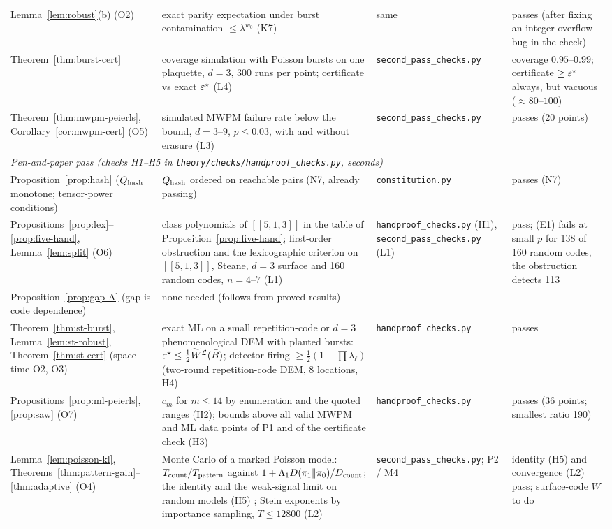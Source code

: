 {\begin{longtable}{p{3.7cm} p{4.5cm} p{3.2cm} p{2.6cm}}
Lemma~\ref{lem:robust}(b) (O2) & exact parity expectation under burst contamination $\le\lambda^{w_0}$ (K7) & same & passes (after fixing an integer-overflow bug in the check) \\
Theorem~\ref{thm:burst-cert} & coverage simulation with Poisson bursts on one plaquette, $d=3$, 300 runs per point; certificate vs exact $\varepsilon^{\star}$ (L4) & \texttt{second\_pass\_checks.py} & coverage $0.95$--$0.99$; certificate $\ge\varepsilon^{\star}$ always, but vacuous ($\approx80$--$100$) \\
Theorem~\ref{thm:mwpm-peierls}, Corollary~\ref{cor:mwpm-cert} (O5) & simulated MWPM failure rate below the bound, $d=3$--$9$, $p\le0.03$, with and without erasure (L3) & \texttt{second\_pass\_checks.py} & passes (20 points) \\
\multicolumn{4}{l}{\emph{Pen-and-paper pass (checks H1--H5 in \texttt{theory/checks/handproof\_checks.py}, seconds)}} \\
Proposition~\ref{prop:hash} ($Q_{\rm hash}$ monotone; tensor-power conditions) & $Q_{\rm hash}$ ordered on reachable pairs (N7, already passing) & \texttt{constitution.py} & passes (N7) \\
Propositions~\ref{prop:lex}--\ref{prop:five-hand}, Lemma~\ref{lem:split} (O6) & class polynomials of $[[5,1,3]]$ in the table of Proposition~\ref{prop:five-hand}; first-order obstruction and the lexicographic criterion on $[[5,1,3]]$, Steane, $d=3$ surface and 160 random codes, $n=4$--$7$ (L1) & \texttt{handproof\_checks.py} (H1), \texttt{second\_pass\_checks.py} (L1) & pass; (E1) fails at small $p$ for 138 of 160 random codes, the obstruction detects 113 \\
Proposition~\ref{prop:gap-A} (gap is code dependence) & none needed (follows from proved results) & -- & -- \\
Theorem~\ref{thm:st-burst}, Lemma~\ref{lem:st-robust}, Theorem~\ref{thm:st-cert} (space-time O2, O3) & exact ML on a small repetition-code or $d=3$ phenomenological DEM with planted bursts: $\varepsilon^{\star}\le\tfrac12\widetilde W^{\mathcal L}(\bar B)$; detector firing $\ge\tfrac12(1-\prod\lambda_\ell)$ (two-round repetition-code DEM, 8 locations, H4) & \texttt{handproof\_checks.py} & passes \\
Propositions~\ref{prop:ml-peierls}, \ref{prop:saw} (O7) & $c_m$ for $m\le14$ by enumeration and the quoted ranges (H2); bounds above all valid MWPM and ML data points of P1 and of the certificate check (H3) & \texttt{handproof\_checks.py} & passes (36 points; smallest ratio 190) \\
Lemma~\ref{lem:poisson-kl}, Theorems~\ref{thm:pattern-gain}--\ref{thm:adaptive} (O4) & Monte Carlo of a marked Poisson model: $T_{\rm count}/T_{\rm pattern}$ against $1+\Lambda_1D(\pi_1\|\pi_0)/D_{\rm count}$; the identity and the weak-signal limit on random models (H5) ; Stein exponents by importance sampling, $T\le12800$ (L2) & \texttt{second\_pass\_checks.py}; P2 / M4 & identity (H5) and convergence (L2) pass; surface-code $W$ to do \\

\end{longtable}}
